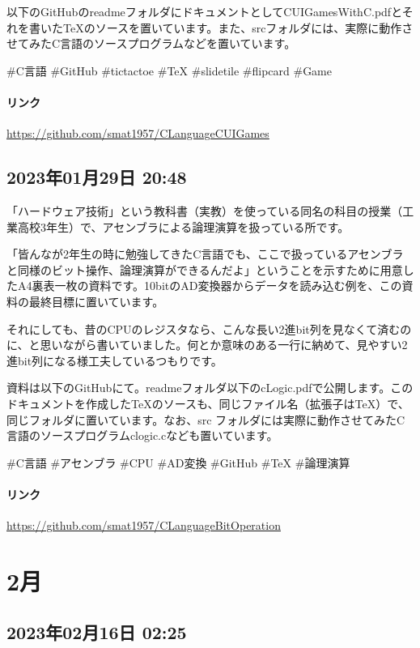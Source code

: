 以下のGitHubのreadmeフォルダにドキュメントとしてCUIGamesWithC.pdfとそれを書いたTeXのソースを置いています。また、srcフォルダには、実際に動作させてみたC言語のソースプログラムなどを置いています。

\#C言語 \#GitHub \#tictactoe \#TeX \#slidetile \#flipcard \#Game

\paragraph{リンク}
\url{https://github.com/smat1957/CLanguageCUIGames}

\subsection*{2023年01月29日 20:48}

「ハードウェア技術」という教科書（実教）を使っている同名の科目の授業（工業高校3年生）で、アセンブラによる論理演算を扱っている所です。

「皆んなが2年生の時に勉強してきたC言語でも、ここで扱っているアセンブラと同様のビット操作、論理演算ができるんだよ」ということを示すために用意したA4裏表一枚の資料です。10bitのAD変換器からデータを読み込む例を、この資料の最終目標に置いています。

それにしても、昔のCPUのレジスタなら、こんな長い2進bit列を見なくて済むのに、と思いながら書いていました。何とか意味のある一行に納めて、見やすい2進bit列になる様工夫しているつもりです。

資料は以下のGitHubにて。readmeフォルダ以下のcLogic.pdfで公開します。このドキュメントを作成したTeXのソースも、同じファイル名（拡張子はTeX）で、同じフォルダに置いています。なお、src フォルダには実際に動作させてみたC言語のソースプログラムclogic.cなども置いています。

\#C言語 \#アセンブラ \#CPU \#AD変換 \#GitHub \#TeX \#論理演算

\paragraph{リンク}
\url{https://github.com/smat1957/CLanguageBitOperation}

\section{2月}

\subsection*{2023年02月16日 02:25}

